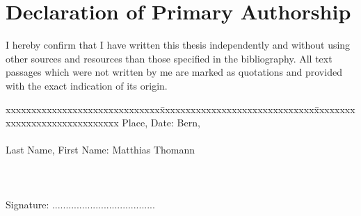 \section{Declaration of Primary Authorship}

\vspace*{10mm} 

I hereby confirm that I have written this thesis independently and without using other sources and resources than those specified in the bibliography.
All text passages which were not written by me are marked as quotations and provided with the exact indication of its origin. 

\vspace{15mm}

\begin{tabbing}
xxxxxxxxxxxxxxxxxxxxxxxxxxxxxx\=xxxxxxxxxxxxxxxxxxxxxxxxxxxxxx\=xxxxxxxxxxxxxxxxxxxxxxxxxxxxxx\kill
Place, Date:		\> Bern, \versiondate \\ \\ 
Last Name, First Name:	\> Matthias Thomann \\ \\ \\ \\ 
Signature:	\> ......................................\\
\end{tabbing}